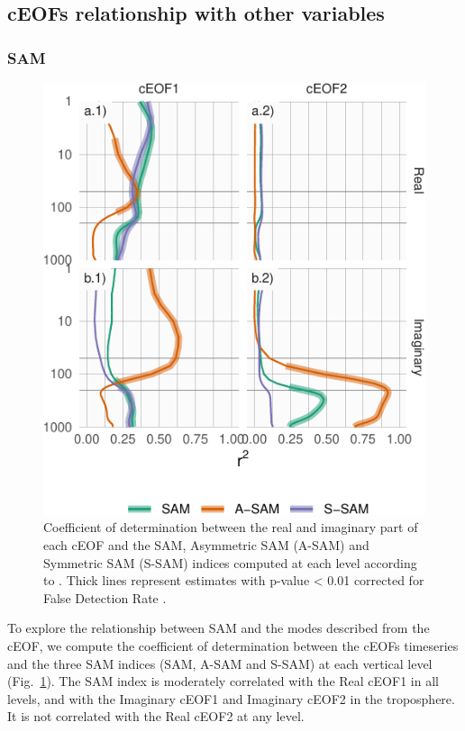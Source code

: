 \documentclass[smallextended]{svjour3}       %
\begin{document}
\hypertarget{other-variables}{%
\subsection{cEOFs relationship with other variables}\label{other-variables}}

\hypertarget{sam}{%
\subsubsection{SAM}\label{sam}}



\begin{figure}
\centering
\includegraphics{../figures/sam-eof-vertical-1.pdf}
\caption{\label{fig:sam-eof-vertical}Coefficient of determination between the real and imaginary part of each cEOF and the SAM, Asymmetric SAM (A-SAM) and Symmetric SAM (S-SAM) indices computed at each level according to \citet{campitelli2021}. Thick lines represent estimates with p-value \textless{} 0.01 corrected for False Detection Rate \citep{benjamini1995}.}
\end{figure}

To explore the relationship between SAM and the modes described from the cEOF, we compute the coefficient of determination between the cEOFs timeseries and the three SAM indices (SAM, A-SAM and S-SAM) at each vertical level (Fig.~\ref{fig:sam-eof-vertical}).
The SAM index is moderately correlated with the Real cEOF1 in all levels, and with the Imaginary cEOF1 and Imaginary cEOF2 in the troposphere.
It is not correlated with the Real cEOF2 at any level.
\end{document}
